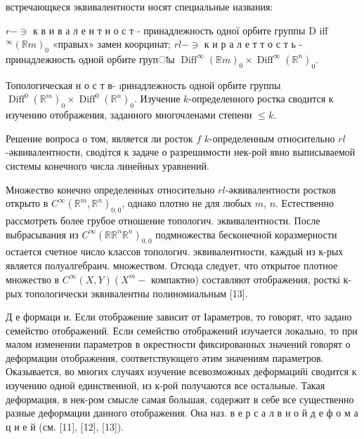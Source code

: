 \documentclass[10pt]{article}
\begin{document}
встречающкеся эквивалентности носят специальные названия:



$r-\ni$ к в и в а л е н т н о с т - принадлежность одної орбите группы $\mathrm{D}$ iff ${ }^{\infty}(\mathbb{R} m)_{0}$ «правых» замен коорцинат; $r l-\ni$ к и р а л е т т о с т ь - принадлежность одной орбите групाы $\operatorname{Diff}^{\infty}(\mathbb{R} m)_{0} \times \operatorname{Diff}^{\infty}\left(\mathbb{R}^{n}\right)_{0}$.



Топологическая н о с т в- ıринадлежность одной орбите группы $\operatorname{Diff}^{0}\left(\mathbb{R}^{m}\right)_{0} \times \operatorname{Diff}^{0}\left(\mathbb{R}^{n}\right)_{0}$. Изучение $k$-определенного ростка сводится к изучению отображения, заданного многочленами степени $\leqslant k$.



Решение вопроса о том, является ли росток $f$ $k$-определенным относительно $r l$-әквивалентности, сводітся к задаче о разрешимости нек-рой явно выписываемой системы конечного числа линейных уравнений.



Множество конечно определенных относительно $r l$-әквивалентности ростков открыто в $C^{\infty}\left(\mathbb{R}^{m}, \mathbb{R}^{n}\right)_{0,0}$, однако плотно не для любых $m$, $n$. Естественно рассмотреть более грубое отношение топологич. эквивалентности. После выбрасывания из $C^{\infty}\left(\mathbb{R} \mathbb{R}^{n} \mathbb{R}^{n}\right)_{0,0}$ подмножества бесконечной коразмерности остается счетное число классов топологич. эквивалентности, каждый из к-рых является полуалгебраич. множеством. Отсюда следует, что открытое плотное множество в $C^{\infty}(X, Y)\left(X^{m}-\right.$ компактно) составляют отображения, росткі к-рых топологически эквивалентны полиномиальным [13].



Д е формаци и. Если отображение зависит от Іараметров, то говорят, что задано семейство отображений. Если семейство отображений изучается локально, то при малом изменении параметров в окрестности фиксированных значений говорят о деформации отображения, соответствующего әтим значениям параметров. Оказывается, во многих случаях изучение всевозможных деформацийі сводится к изучению одной единственной, из к-рой получаются все остальные. Такая деформация, в нек-ром смысле самая большая, содержит в себе все существенно разные деформации данного отображения. Она наз. в е р с а л в н о й д е ф о м а ц и е й (см. [11], [12], [13]).
\end{document}
